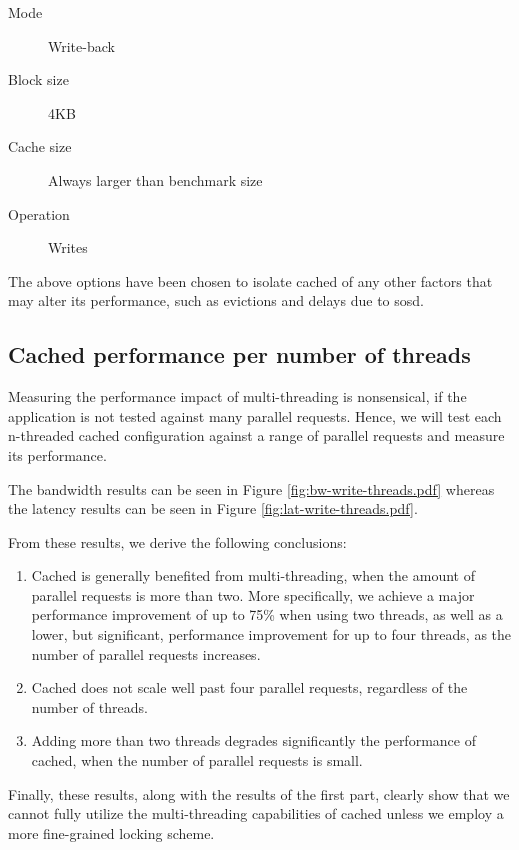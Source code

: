 \begin{description}
	\item[Mode] Write-back
	\item[Block size] 4KB
	\item[Cache size] Always larger than benchmark size
	\item[Operation] Writes
\end{description}

The above options have been chosen to isolate cached of any other factors that 
may alter its performance, such as evictions and delays due to sosd.

\subsection{Cached performance per number of threads}

Measuring the performance impact of multi-threading is nonsensical, if the 
application is not tested against many parallel requests. Hence, we will test 
each n-threaded cached configuration against a range of parallel requests and 
measure its performance.

The bandwidth results can be seen in Figure \ref{fig:bw-write-threads.pdf} 
whereas the latency results can be seen in Figure 
\ref{fig:lat-write-threads.pdf}.


From these results, we derive the following conclusions:

\begin{enumerate}
	\item Cached is generally benefited from multi-threading, when the amount 
		of parallel requests is more than two. More specifically, we achieve a 
		major performance improvement of up to 75\% when using two threads, as 
		well as a lower, but significant, performance improvement for up to 
		four threads, as the number of parallel requests increases.
	\item Cached does not scale well past four parallel requests, regardless of 
		the number of threads.
	\item Adding more than two threads degrades significantly the performance 
		of cached, when the number of parallel requests is small.
\end{enumerate}

Finally, these results, along with the results of the first part, clearly show 
that we cannot fully utilize the multi-threading capabilities of cached unless 
we employ a more fine-grained locking scheme.

